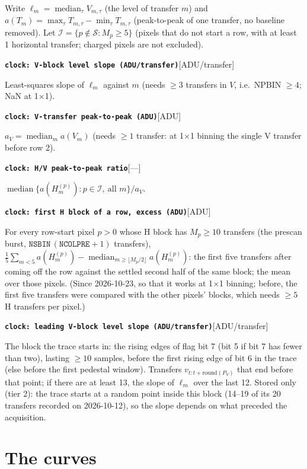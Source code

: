 \documentclass[10pt]{article}
\newcommand{\code}[1]{\texttt{#1}}
\newcommand{\feat}[2]{\par\medskip\noindent\textbf{\texttt{#1}}\hfill{\small [#2]}\par\nopagebreak\smallskip}
\newcommand{\med}{\operatorname*{median}}
\begin{document}
Write $\ell_m = \med_\tau V_{m,\tau}$ (the level of transfer $m$) and $a(T_m) = \max_\tau T_{m,\tau} - \min_\tau T_{m,\tau}$ (peak-to-peak
of one transfer, no baseline removed). Let $\mathcal I = \{p \notin \mathcal S : M_p \ge 5\}$ (pixels that do not start a row, with at
least 1 horizontal transfer; charged pixels are not excluded).
\feat{clock: V-block level slope (ADU/transfer)}{ADU/transfer}
Least-squares slope of $\ell_m$ against $m$ (needs $\ge 3$ transfers in $V$, i.e.\ NPBIN $\ge 4$; NaN at 1$\times$1).
\feat{clock: V-transfer peak-to-peak (ADU)}{ADU}
$a_V = \med_m a(V_m)$ (needs $\ge 1$ transfer: at 1$\times$1 binning the single V transfer before row 2).
\feat{clock: H/V peak-to-peak ratio}{---}
$\med\{a(H^{(p)}_m) : p\in\mathcal I,\ \text{all } m\}/a_V$.
\feat{clock: first H block of a row, excess (ADU)}{ADU}
For every row-start pixel $p > 0$ whose H block has $M_p \ge 10$ transfers (the prescan burst,
$\code{NSBIN}\,(\code{NCOLPRE}+1)$ transfers), $\tfrac15\sum_{m<5} a(H^{(p)}_m) - \med_{m \ge \lfloor M_p/2\rfloor} a(H^{(p)}_m)$: the
first five transfers after coming off the row against the settled second half of the same block; the mean over those pixels.
(Since 2026-10-23, so that it works at 1$\times$1 binning; before, the first five transfers were compared with the other pixels'
blocks, which needs $\ge 5$ H transfers per pixel.)
\feat{clock: leading V-block level slope (ADU/transfer)}{ADU/transfer}
The block the trace starts in: the rising edges of flag bit 7 (bit 5 if bit 7 has fewer than two), lasting $\ge 10$ samples, before the
first rising edge of bit 6 in the trace (else before the first pedestal window). Transfers $v_{t:t+\mathrm{round}(P_V)}$ that end before that
point; if there are at least 13, the slope of $\ell_m$ over the last 12. Stored only (tier 2): the trace starts at a random point inside
this block (14--19 of its 20 transfers recorded on 2026-10-12), so the slope depends on what preceded the acquisition.

\section{The curves}
\end{document}
